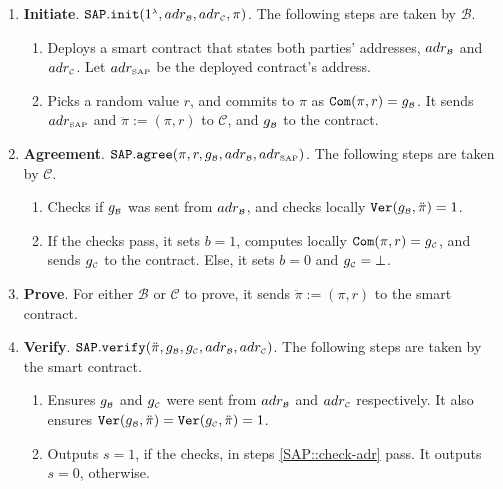 {\small{
 \begin{enumerate}
 \item\textbf{Initiate}. $\mathtt{SAP.init}(1^{\scriptscriptstyle\lambda}, adr_{\scriptscriptstyle\mathcal{B}}, adr_{\scriptscriptstyle\mathcal{C}}, \pi )$.
%
 The following steps are taken   by  $\mathcal B$.
  \begin{enumerate}
  \item\label{SAP::deploy-contract}  Deploys a smart contract that   states both parties'  addresses, $adr_{\scriptscriptstyle\mathcal{B}}$ and  $adr_{\scriptscriptstyle\mathcal{C}}$. Let $adr_{\scriptscriptstyle\text{SAP}}$ be the deployed contract's address. 
%
   \item  Picks a random value $r$, and commits to $\pi$ as $\mathtt{Com}(\pi, r)=g_{\scriptscriptstyle \mathcal{B}}$.
    It sends $adr_{\scriptscriptstyle\text{SAP}}$ and $\ddot{\pi}:=(\pi, r)$  to  $\mathcal C$, and $g_{\scriptscriptstyle\mathcal B}$ to the contract. 
    \end{enumerate}
    \item\textbf{Agreement}. $\mathtt{SAP.agree}(\pi, r, g_{\scriptscriptstyle \mathcal{B}}, adr_{\scriptscriptstyle\mathcal{B}}, adr_{\scriptscriptstyle\text{SAP}})$.
%
     The following steps are taken   by  $\mathcal C$.
     \begin{enumerate}
   \item Checks  if $g_{\scriptscriptstyle \mathcal{B}}$ was  sent  from $adr_{\scriptscriptstyle \mathcal{B}}$, and checks locally $\mathtt{Ver}(g_{\scriptscriptstyle\mathcal B}, \ddot{\pi})=1$.
   \item If the checks pass, it sets $b=1$,    computes locally $\mathtt{Com}(\pi, r)=g_{\scriptscriptstyle\mathcal C}$, and sends $g_{\scriptscriptstyle\mathcal C}$ to the contract. Else, it sets $b=0$ and $g_{\scriptscriptstyle\mathcal C}=\bot$.
    \end{enumerate}
%
   \item\textbf{Prove}. For either $\mathcal B$ or $\mathcal C$ to prove, it sends $\ddot{\pi}:=(\pi, r)$  to the smart contract. 
 \item\textbf{Verify}. $\mathtt{SAP.verify}(\ddot{\pi}, g_{\scriptscriptstyle\mathcal B},g_{\scriptscriptstyle\mathcal C}, adr_{\scriptscriptstyle\mathcal{B}}, adr_{\scriptscriptstyle\mathcal{C}})$. 
 The following steps are taken   by  the smart contract.
   \begin{enumerate}
   
\item\label{SAP::check-adr} Ensures $g_{\scriptscriptstyle\mathcal B}$ and $g_{\scriptscriptstyle\mathcal C}$ were sent from   $adr_{\scriptscriptstyle \mathcal{B}}$ and  $adr_{\scriptscriptstyle \mathcal{C}}$  respectively. 
%
It also ensures $\mathtt{Ver}(g_{\scriptscriptstyle\mathcal B},\ddot{\pi})=\mathtt{Ver}(g_{\scriptscriptstyle\mathcal C},\ddot{\pi}) =1$.
   
   \item Outputs $s=1$, if the checks, in steps \ref{SAP::check-adr}  pass. It outputs $s=0$, otherwise.
    \end{enumerate}
 \end{enumerate}
 }}
\vspace{-2mm}
  

